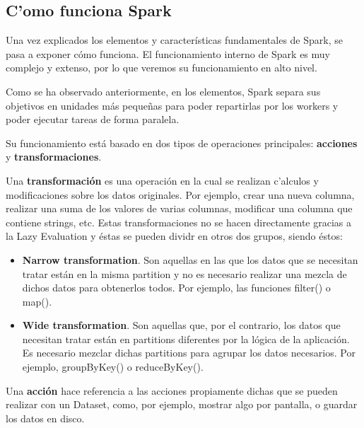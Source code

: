 




\subsection{C'omo funciona Spark}

Una vez explicados los elementos y características fundamentales de Spark, se pasa a exponer cómo funciona. El funcionamiento interno de Spark es muy complejo y extenso, por lo que veremos su funcionamiento en alto nivel.


Como se ha observado anteriormente, en los elementos, Spark separa sus objetivos en unidades más pequeñas para poder repartirlas por los workers y poder ejecutar tareas de forma paralela.

Su funcionamiento está basado en dos tipos de operaciones principales: \textbf{acciones} y \textbf{transformaciones}. 

Una \textbf{transformación} es una operación en la cual se realizan c'alculos y modificaciones sobre los datos originales. Por ejemplo, crear una nueva columna, realizar una suma de los valores de varias columnas, modificar una columna que contiene strings, etc. Estas transformaciones no se hacen directamente gracias a la Lazy Evaluation y éstas se pueden dividr en otros dos grupos, siendo éstos:

\begin{itemize}
\item \textbf{Narrow transformation}. Son aquellas en las que los datos que se necesitan tratar están en la misma partition y no es necesario realizar una mezcla de dichos datos para obtenerlos todos. Por ejemplo, las funciones filter() o map().


\item \textbf{Wide transformation}. Son aquellas que, por el contrario, los datos que necesitan tratar están en partitions diferentes por la lógica de la aplicación. Es necesario mezclar dichas partitions para agrupar los datos necesarios. Por ejemplo, groupByKey() o reduceByKey().




\end{itemize}


\clearpage



Una \textbf{acción} hace referencia a las acciones propiamente dichas que se pueden realizar con un Dataset, como, por ejemplo, mostrar algo por pantalla, o guardar los datos en disco.


